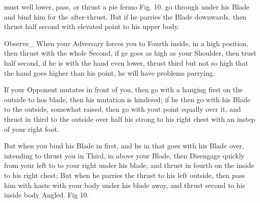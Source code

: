 \newpage


\newpage


must well lower, pass, or thrust a pie fermo Fig. 10. go through under his Blade and bind him for the after-thrust. But if he parries the Blade downwards. then thrust half second with elevated point to his upper body.

\exercise{}


Observe_ When your Adversary forces you to Fourth inside, in a high
position, then thrust with the whole Second, if ge goes as high as
your Shoulder, then trust half second, if he is with the hand even
lower, thrust third but not so high that the hand goes higher than his
point, he will have problems parrying.

\exercise{}


If your Opponent mutates in front of you, then go with a hanging first
on the outside to hos blade, then his mutation is hindered; if he then
go with his Blade to the outside, somewhat raised, then go with yout
point equally over it, and thrust in third to the outside over half
his strong to his right chest with an instep of your right foot.


\exercise{}

But when you bind his Blade in first, and he in that goes with his
Blade over, intending to thrust you in Third, in above your Blade,
then Disengage quickly from your left to to your right under his
blade, and thrust in fourth on the inside to his right chest; But when
he parries the thrust to his left outside, then pass him with haste
with your body under his blade away, and thrust second to his inside
body Angled. Fig 10.

